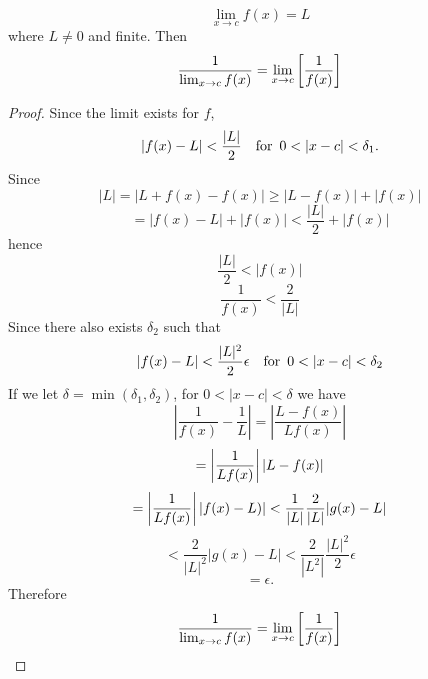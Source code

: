 \begin{theorem}
	$$\lim_{x\to c}f(x)=L$$
where $L\neq0$ and finite. Then
$$\frac{1}{\lim_{x\to c}f(x)}=\lim_{x\to c}\left[\frac{1}{f(x)}\right]$$
\end{theorem}
\begin{proof}
	Since the limit exists for $f$,
	$$|f(x)-L|<\frac{|L|}{2} \for 0<|x-c|<\delta_1.$$
	Since
	$$|L|=|L+f(x)-f(x)|\ge |L-f(x)|+|f(x)|$$
	$$=|f(x)-L|+|f(x)|<\frac{|L|}{2}+|f(x)|$$
	hence
	$$\frac{|L|}{2}<|f(x)|$$
	$$\frac{1}{f(x)}<\frac{2}{|L|}$$
	Since there also exists $\delta_2$ such that
	$$|f(x)-L|<\frac{|L|^2}{2} \epsilon \for 0 <|x-c|<\delta_2$$
	If we let $\delta=\min(\delta_1,\delta_2)$, for $0<|x-c|<\delta$ we have
	$$|\frac{1}{f(x)}-\frac{1}{L}|=|\frac{L-f(x)}{Lf(x)}|$$
	$$=\left\lvert \frac{1}{Lf(x)} \right\rvert|L-f(x)|$$
	$$=\left\lvert \frac{1}{Lf(x)} \right\rvert|f(x)-L)|<\frac{1}{|L|}\frac{2}{|L|}|g(x)-L|$$
	$$<\frac{2}{|L|^2}|g(x)-L|<\frac{2}{|L^2|}\frac{|L|^2}{2}\epsilon$$
	$$=\epsilon.$$
	Therefore
	$$\frac{1}{\lim_{x\to c}f(x)}=\lim_{x\to c}\left[\frac{1}{f(x)}\right]$$
\end{proof}









